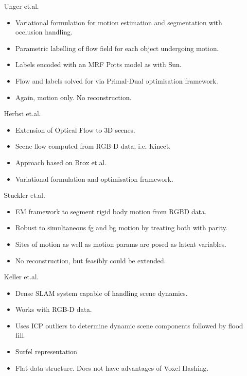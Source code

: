 Unger et.al. \cite{Unger2012}
\begin{itemize}
	\item Variational formulation for motion estimation and segmentation with occlusion handling.
	\item Parametric labelling of flow field for each object undergoing motion.
	\item Labels encoded with an MRF Potts model as with Sun. %
	\item Flow and labels solved for via Primal-Dual optimisation framework. %
	\item Again, motion only. No reconstruction.
\end{itemize}

Herbst et.al. \cite{Herbst2013}
\begin{itemize}
	\item Extension of Optical Flow to 3D scenes.
	\item Scene flow computed from RGB-D data, i.e. Kinect.
	\item Approach based on Brox et.al. \cite{Brox2004}
	\item Variational formulation and optimisation framework.
\end{itemize}

Stuckler et.al. \cite{Stueckler2013}
\begin{itemize}
	\item EM framework to segment rigid body motion from RGBD data.
	\item Robust to simultaneous fg and bg motion by treating both with parity.
	\item Sites of motion as well as motion params are posed as latent variables.
	\item No reconstruction, but feasibly could be extended.
\end{itemize}

Keller et.al. \cite{Keller2013}
\begin{itemize}
	\item Dense SLAM system capable of handling scene dynamics.
	\item Works with RGB-D data.
	\item Uses ICP outliers to determine dynamic scene components followed by flood fill.
	\item Surfel representation \cite{Pfister2000}
	\item Flat data structure. Does not have advantages of Voxel Hashing.
\end{itemize}

